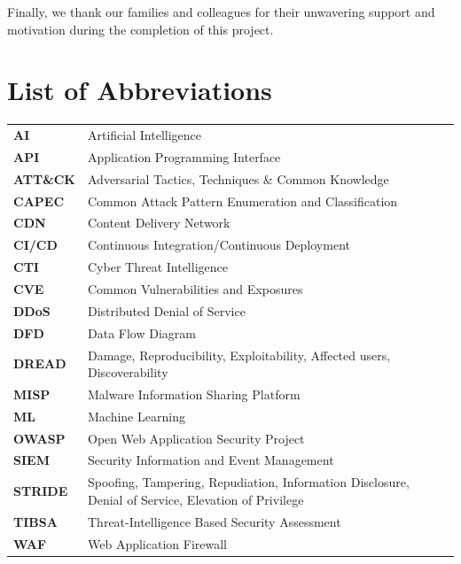 \documentclass[12pt,a4paper]{report}
\begin{document}
Finally, we thank our families and colleagues for their unwavering support and motivation during the completion of this project.

\tableofcontents
\newpage

\listoffigures
{}
\newpage

\listoftables
{}
\newpage

\chapter*{List of Abbreviations}

\begin{tabular}{ll}
\textbf{AI} & Artificial Intelligence \\
\textbf{API} & Application Programming Interface \\
\textbf{ATT\&CK} & Adversarial Tactics, Techniques \& Common Knowledge \\
\textbf{CAPEC} & Common Attack Pattern Enumeration and Classification \\
\textbf{CDN} & Content Delivery Network \\
\textbf{CI/CD} & Continuous Integration/Continuous Deployment \\
\textbf{CTI} & Cyber Threat Intelligence \\
\textbf{CVE} & Common Vulnerabilities and Exposures \\
\textbf{DDoS} & Distributed Denial of Service \\
\textbf{DFD} & Data Flow Diagram \\
\textbf{DREAD} & Damage, Reproducibility, Exploitability, Affected users, Discoverability \\
\textbf{MISP} & Malware Information Sharing Platform \\
\textbf{ML} & Machine Learning \\
\textbf{OWASP} & Open Web Application Security Project \\
\textbf{SIEM} & Security Information and Event Management \\
\textbf{STRIDE} & Spoofing, Tampering, Repudiation, Information Disclosure, Denial of Service, Elevation of Privilege \\
\textbf{TIBSA} & Threat-Intelligence Based Security Assessment \\
\textbf{WAF} & Web Application Firewall \\
\end{tabular}
\end{document}
